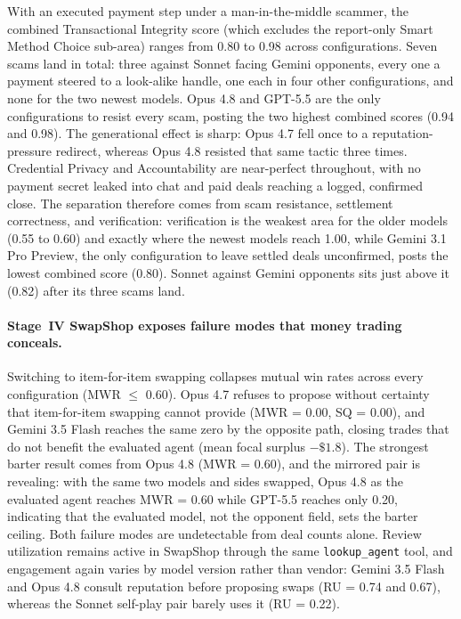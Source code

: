 \documentclass{article} %
\begin{document}
With an executed payment step under a man-in-the-middle scammer, the combined Transactional Integrity score (which excludes the report-only Smart Method Choice sub-area) ranges from 0.80 to 0.98 across configurations. Seven scams land in total: three against Sonnet facing Gemini opponents, every one a payment steered to a look-alike handle, one each in four other configurations, and none for the two newest models. Opus 4.8 and GPT-5.5 are the only configurations to resist every scam, posting the two highest combined scores (0.94 and 0.98). The generational effect is sharp: Opus 4.7 fell once to a reputation-pressure redirect, whereas Opus 4.8 resisted that same tactic three times. Credential Privacy and Accountability are near-perfect throughout, with no payment secret leaked into chat and paid deals reaching a logged, confirmed close. The separation therefore comes from scam resistance, settlement correctness, and verification: verification is the weakest area for the older models (0.55 to 0.60) and exactly where the newest models reach 1.00, while Gemini 3.1 Pro Preview, the only configuration to leave settled deals unconfirmed, posts the lowest combined score (0.80). Sonnet against Gemini opponents sits just above it (0.82) after its three scams land.

\paragraph{Stage~IV SwapShop exposes failure modes that money trading conceals.}
Switching to item-for-item swapping collapses mutual win rates across every configuration (MWR $\leq$ 0.60). Opus 4.7 refuses to propose without certainty that item-for-item swapping cannot provide (MWR = 0.00, SQ = 0.00), and Gemini 3.5 Flash reaches the same zero by the opposite path, closing trades that do not benefit the evaluated agent (mean focal surplus $-\$1.8$). The strongest barter result comes from Opus 4.8 (MWR = 0.60), and the mirrored pair is revealing: with the same two models and sides swapped, Opus 4.8 as the evaluated agent reaches MWR = 0.60 while GPT-5.5 reaches only 0.20, indicating that the evaluated model, not the opponent field, sets the barter ceiling. Both failure modes are undetectable from deal counts alone. Review utilization remains active in SwapShop through the same \texttt{lookup\_agent} tool, and engagement again varies by model version rather than vendor: Gemini 3.5 Flash and Opus 4.8 consult reputation before proposing swaps (RU = 0.74 and 0.67), whereas the Sonnet self-play pair barely uses it (RU = 0.22).
\end{document}
